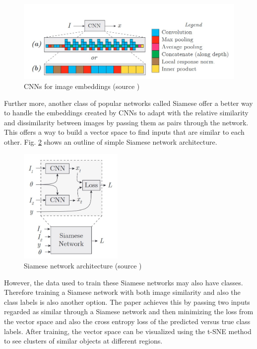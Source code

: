 \documentclass{article}
\begin{document}
\begin{figure}[H]
  \centering
    \includegraphics[width=\linewidth]{CNN_image.jpg}
    \caption{CNNs for image embeddings (source \cite{bell2015learning})}
    \label{fig:cnn}
\end{figure}

Further more, another class of popular networks called Siamese offer a better way to handle the embeddings created by CNNs to adapt with the relative similarity and dissimilarity between images by passing them as pairs through the network. This offers a way to build a vector space to find inputs that are similar to each other. Fig. \ref{fig:siamese} shows an outline of simple Siamese network architecture.  

\begin{figure}[H]
  \centering
    \includegraphics[width=50mm]{siamese_img.jpg}
    \caption{Siamese network architecture (source \cite{bell2015learning})}
    \label{fig:siamese}
\end{figure}

However, the data used to train these Siamese networks may also have classes. Therefore training a Siamese network with both image similarity and also the class labels is also another option. The paper\cite{bell2015learning} achieves this by passing two inputs regarded as similar through a Siamese network and then minimizing the loss from the vector space and also the cross entropy loss of the predicted versus true class labels. After training, the vector space can be visualized using the t-SNE method to see clusters of similar objects at different regions.
\end{document}
